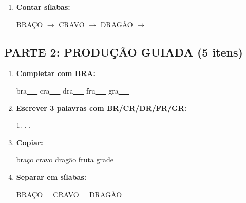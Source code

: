 \begin{exercicio}
\begin{enumerate}
  \item \textbf{Contar sílabas:}
  \begin{center}
  BRAÇO $\rightarrow$ \underline{\hspace{0.9cm}} \quad CRAVO $\rightarrow$ \underline{\hspace{0.9cm}} \quad DRAGÃO $\rightarrow$ \underline{\hspace{0.9cm}}
  \end{center}

\end{enumerate}

\subsection*{PARTE 2: PRODUÇÃO GUIADA (5 itens)}

\begin{enumerate}[resume]

  \item \textbf{Completar com BRA:}
  \begin{center}
  bra\underline{~~~} \quad cra\underline{~~~} \quad dra\underline{~~~} \quad fru\underline{~~~} \quad gra\underline{~~~}
  \end{center}

  \item \textbf{Escrever 3 palavras com BR/CR/DR/FR/GR:}
  \begin{center}
  1. \underline{\hspace{3cm}} . \underline{\hspace{3cm}} . \underline{\hspace{3cm}}
  \end{center}

  \item \textbf{Copiar:}
  \begin{center}
  braço \quad cravo \quad dragão \quad fruta \quad grade
  \end{center}

  \item \textbf{Separar em sílabas:}
  \begin{center}
  BRAÇO = \underline{\hspace{1cm}} \underline{\hspace{1cm}} \quad CRAVO = \underline{\hspace{1cm}} \underline{\hspace{1cm}} \quad DRAGÃO = \underline{\hspace{1cm}} \underline{\hspace{1cm}}
  \end{center}


\end{enumerate}
\end{exercicio}
